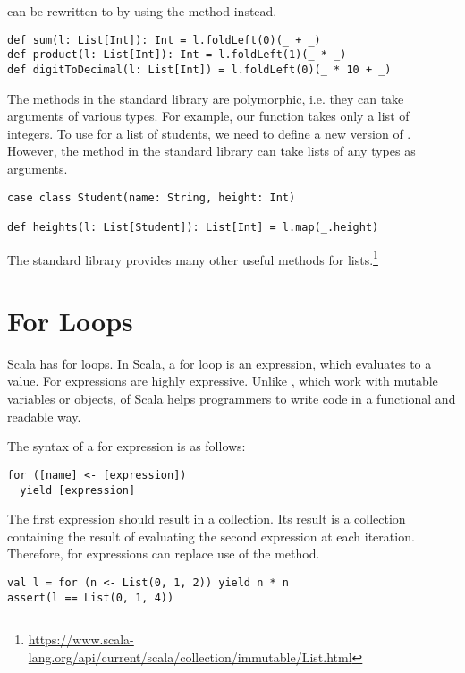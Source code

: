  can be rewritten to  by using the
 method instead.

\begin{verbatim}
def sum(l: List[Int]): Int = l.foldLeft(0)(_ + _)
def product(l: List[Int]): Int = l.foldLeft(1)(_ * _)
def digitToDecimal(l: List[Int]) = l.foldLeft(0)(_ * 10 + _)
\end{verbatim}

The methods in the standard library are polymorphic, i.e. they can take
arguments of various types. For example, our  function takes only a
list of integers. To use  for a list of students, we need to define a
new version of . However, the  method in the standard
library can take lists of any types as arguments.

\begin{verbatim}
case class Student(name: String, height: Int)

def heights(l: List[Student]): List[Int] = l.map(_.height)
\end{verbatim}

The standard library provides many other useful methods for
lists.\footnote{\url{https://www.scala-lang.org/api/current/scala/collection/immutable/List.html}}

\section{For Loops}

Scala has for loops.
In Scala, a for loop is an expression, which evaluates to a value.
For expressions are highly expressive.
Unlike , which work with mutable variables or objects,
 of Scala helps programmers to write code in a functional and readable way.

The syntax of a for expression is as follows:

\begin{verbatim}
for ([name] <- [expression])
  yield [expression]
\end{verbatim}

The first expression should result in a collection.
Its result is a collection containing the result of evaluating the second expression
at each iteration.
Therefore, for expressions can replace use of the  method.

\begin{verbatim}
val l = for (n <- List(0, 1, 2)) yield n * n
assert(l == List(0, 1, 4))
\end{verbatim}


